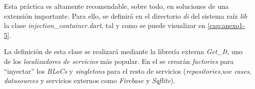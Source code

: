 Esta práctica es altamente recomendable, sobre todo, en soluciones de una
extensión importante. Para ello, se definirá en el directorio \textit{di} del sistema raíz \textit{lib} la clase
\textit{injection\_container.dart}, tal y como se puede visualizar en \autoref{cap:anexo1-5}.

La definición de esta clase se realizará mediante la librería externa \textit{Get\_It}, uno de los \textit{localizadores de servicios}
más popular. En el se crearán \textit{factories} para ``inyectar'' los \textit{BLoCs} y \textit{singletons} para el resto de
servicios (\textit{repositories},\textit{use cases}, \textit{datasources} y servicios externos como \textit{Firebase} y \textit{Sqflite}).